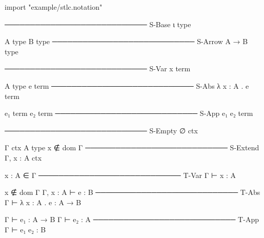 \documentclass{article}
\begin{document}
\begin{inference-notation}
import "example/stlc.notation"
\end{inference-notation}

\begin{inference}[rule_set=STLC syntax]
──────────────────────────── S-Base
ι type

A type
B type
──────────────────────────── S-Arrow
A → B type

──────────────────────────── S-Var
x term

A type
e term
──────────────────────────── S-Abs
λ x : A . e term

e₁ term
e₂ term
──────────────────────────── S-App
e₁ e₂ term

──────────────────────────── S-Empty
∅ ctx

Γ ctx
A type
x ∉ dom Γ
──────────────────────────── S-Extend
Γ, x : A ctx
\end{inference}

\begin{inference}[rule_set=STLC typing]
x : A ∈ Γ
──────────────────────────── T-Var
Γ ⊢ x : A

x ∉ dom Γ
Γ, x : A ⊢ e : B
──────────────────────────── T-Abs
Γ ⊢ λ x : A . e : A → B

Γ ⊢ e₁ : A → B
Γ ⊢ e₂ : A
──────────────────────────── T-App
Γ ⊢ e₁ e₂ : B
\end{inference}
\end{document}
